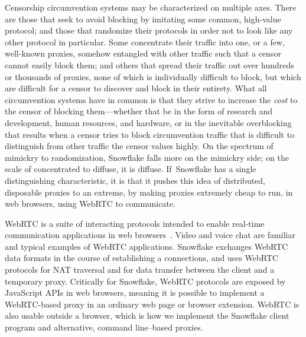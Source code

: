 \documentclass[letterpaper,twocolumn]{article}
\begin{document}
Censorship circumvention systems
may be characterized on multiple axes.
There are those that seek to avoid blocking
by imitating some common, high-value protocol;
and those that randomize their protocols
in order not to look like any other protocol in particular.
Some concentrate their traffic into one, or a few,
well-known proxies, somehow entangled with other traffic
such that a censor cannot easily block them;
and others that spread their traffic out over
hundreds or thousands of proxies,
none of which is individually difficult to block,
but which are difficult for a censor to discover and block in their entirety.
What all circumvention systems have in common
is that they strive to increase the \emph{cost}
to the censor of blocking them---whether that be
in the form of research and development,
human resources, and hardware,
or in the inevitable overblocking that results
when a censor tries to block circumvention traffic
that is difficult to distinguish from other traffic
the censor values highly.
On the spectrum of mimickry to randomization,
Snowflake falls more on the mimickry side;
on the scale of concentrated to diffuse,
it is diffuse.
If~Snowflake has a single distinguishing characteristic,
it is that it pushes this idea of distributed, disposable
proxies to an extreme,
by making proxies extremely cheap to run,
in web browsers, using WebRTC to communicate.

WebRTC is a suite of interacting protocols
intended to enable real-time communication applications
in web browsers~\cite{rfc8825}.
Video and voice chat are familiar and typical examples
of WebRTC applications.
Snowflake exchanges WebRTC data formats
in the course of establishing a connections,
and uses WebRTC protocols for NAT traversal
and for data transfer between the client and a temporary proxy.
Critically for Snowflake, WebRTC protocols
are exposed by JavaScript APIs in web browsers,
meaning it is possible to implement a WebRTC-based proxy
in an ordinary web page or browser extension.
WebRTC is also usable outside a browser,
which is how we implement the Snowflake client program
and alternative, command line--based proxies.
\end{document}
